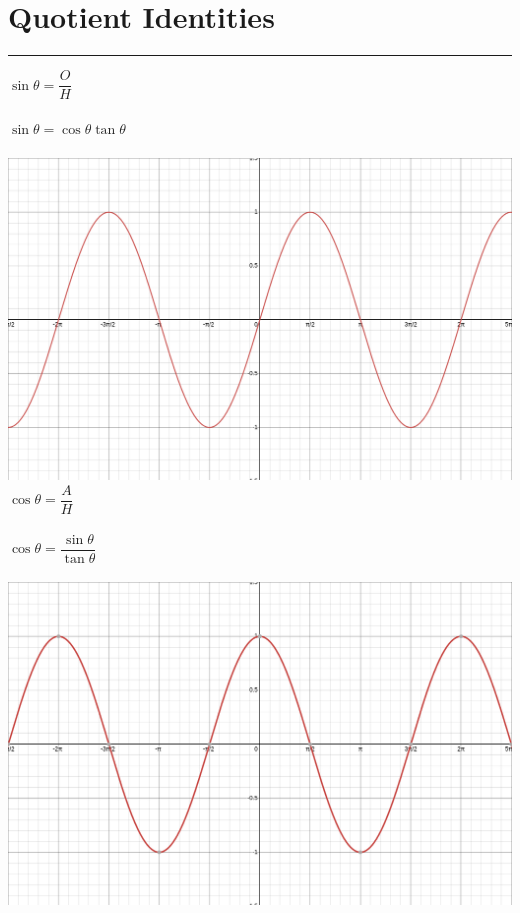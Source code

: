 \documentclass{article}
\begin{document}
\LARGE
\section{Quotient Identities}
\hrule
\begin{multicols}{3}
    \noindent
    $\sin \theta = \dfrac{O}{H}$                       \\\\
    $\sin \theta = \cos \theta \tan \theta$\\\\
    \includegraphics[scale=0.15]{images/sin.png}       \\
    $\cos \theta = \dfrac{A}{H}$                       \\\\
    $\cos \theta = \dfrac{\sin \theta}{\tan \theta}$   \\\\
    \includegraphics[scale=0.15]{images/cos.png}       \\

\end{multicols}
\end{document}

